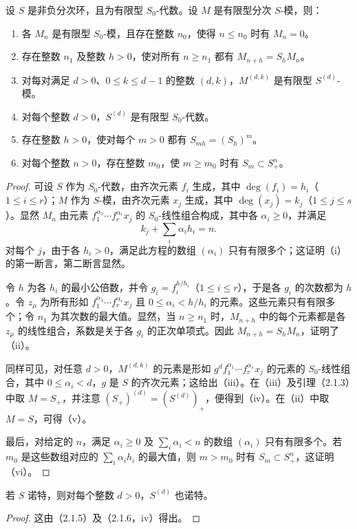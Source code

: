 设 $S$ 是非负分次环，且为有限型 $S_0$-代数。设 $M$ 是有限型分次 $S$-模，则：
\begin{enumerate}[label=(\roman*)]
\item 各 $M_n$ 是有限型 $S_0$-模，且存在整数 $n_0$，使得 $n\leq n_0$ 时有 $M_n=0$。
\item 存在整数 $n_1$ 及整数 $h>0$，使对所有 $n\geq n_1$ 都有 $M_{n+h}=S_hM_n$。
\item 对每对满足 $d>0$、$0\leq k\leq d-1$ 的整数 $(d,k)$，$M^{(d,k)}$ 是有限型 $S^{(d)}$-模。
\item 对每个整数 $d>0$，$S^{(d)}$ 是有限型 $S_0$-代数。
\item 存在整数 $h>0$，使对每个 $m>0$ 都有 $S_{mh}=(S_h)^m$。
\item 对每个整数 $n>0$，存在整数 $m_0$，使 $m\geq m_0$ 时有 $S_m\subset S_+^n$。
\end{enumerate}
\begin{proof}
可设 $S$ 作为 $S_0$-代数，由齐次元素 $f_i$ 生成，其中 $\deg(f_i)=h_i$（$1\leq i\leq r$）；$M$ 作为 $S$-模，由齐次元素 $x_j$ 生成，其中 $\deg(x_j)=k_j$（$1\leq j\leq s$）。显然 $M_n$ 由元素
$f_1^{\alpha_1}\cdots f_r^{\alpha_r}x_j$ 的 $S_0$-线性组合构成，其中各 $\alpha_i\geq0$，并满足
\[
k_j+\sum_i\alpha_ih_i=n.
\]
对每个 $j$，由于各 $h_i>0$，满足此方程的数组 $(\alpha_i)$ 只有有限多个；这证明（i）的第一断言，第二断言显然。

令 $h$ 为各 $h_i$ 的最小公倍数，并令 $g_i=f_i^{h/h_i}$（$1\leq i\leq r$），于是各 $g_i$ 的次数都为 $h$。令 $z_\mu$ 为所有形如
$f_1^{\alpha_1}\cdots f_r^{\alpha_r}x_j$ 且 $0\leq\alpha_i<h/h_i$ 的元素。这些元素只有有限多个；令 $n_1$ 为其次数的最大值。显然，当 $n\geq n_1$ 时，$M_{n+h}$ 中的每个元素都是各 $z_\mu$ 的线性组合，系数是关于各 $g_i$ 的正次单项式。因此
$M_{n+h}=S_hM_n$，证明了（ii）。

同样可见，对任意 $d>0$，$M^{(d,k)}$ 的元素是形如
$g^df_1^{\alpha_1}\cdots f_r^{\alpha_r}x_j$ 的元素的 $S_0$-线性组合，其中 $0\leq\alpha_i<d$，$g$ 是 $S$ 的齐次元素；这给出（iii）。在（iii）及引理（2.1.3）中取 $M=S_+$，并注意 $(S_+)^{(d)}=(S^{(d)})_+$，便得到（iv）。在（ii）中取 $M=S$，可得（v）。

最后，对给定的 $n$，满足 $\alpha_i\geq0$ 及 $\sum_i\alpha_i<n$ 的数组 $(\alpha_i)$ 只有有限多个。若 $m_0$ 是这些数组对应的 $\sum_i\alpha_ih_i$ 的最大值，则 $m>m_0$ 时有 $S_m\subset S_+^n$，这证明（vi）。
\end{proof}

若 $S$ 诺特，则对每个整数 $d>0$，$S^{(d)}$ 也诺特。
\begin{proof}
这由（2.1.5）及（2.1.6，iv）得出。
\end{proof}

